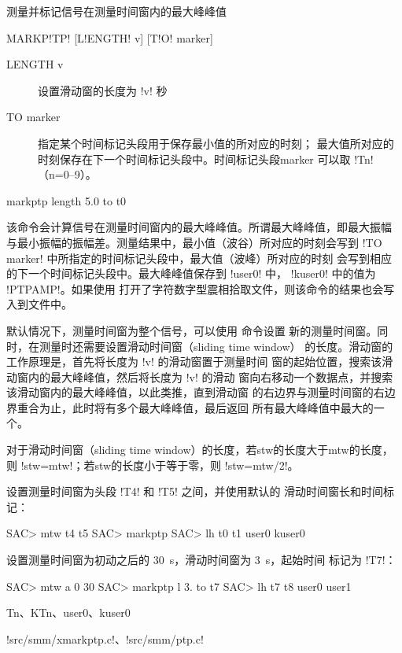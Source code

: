 \label{cmd:markptp}

测量并标记信号在测量时间窗内的最大峰峰值

\begin{SACSTX}
MARKP!TP! [L!ENGTH! v] [T!O! marker]
\end{SACSTX}

\begin{description}
\item [LENGTH v] 设置滑动窗的长度为 !v! 秒
\item [TO marker] 指定某个时间标记头段用于保存最小值的所对应的时刻；
    最大值所对应的时刻保存在下一个时间标记头段中。时间标记头段marker
    可以取 !Tn!（n=0--9）。
\end{description}

\begin{SACDFT}
markptp length 5.0 to t0
\end{SACDFT}

该命令会计算信号在测量时间窗内的最大峰峰值。所谓最大峰峰值，即最大振幅
与最小振幅的振幅差。测量结果中，最小值（波谷）所对应的时刻会写到
!TO marker! 中所指定的时间标记头段中，最大值（波峰）所对应的时刻
会写到相应的下一个时间标记头段中。最大峰峰值保存到 !user0! 中，
!kuser0! 中的值为 !PTPAMP!。如果使用 
打开了字符数字型震相拾取文件，则该命令的结果也会写入到文件中。

默认情况下，测量时间窗为整个信号，可以使用  命令设置
新的测量时间窗。同时，在测量时还需要设置滑动时间窗（sliding time window）
的长度。滑动窗的工作原理是，首先将长度为 !v! 的滑动窗置于测量时间
窗的起始位置，搜索该滑动窗内的最大峰峰值，然后将长度为 !v! 的滑动
窗向右移动一个数据点，并搜索该滑动窗内的最大峰峰值，以此类推，直到滑动窗
的右边界与测量时间窗的右边界重合为止，此时将有多个最大峰峰值，最后返回
所有最大峰峰值中最大的一个。

对于滑动时间窗（sliding time window）的长度，若stw的长度大于mtw的长度，
则 !stw=mtw!；若stw的长度小于等于零，则 !stw=mtw/2!。

设置测量时间窗为头段 !T4! 和 !T5! 之间，并使用默认的
滑动时间窗长和时间标记：
\begin{SACCode}
SAC> mtw t4 t5
SAC> markptp
SAC> lh t0 t1 user0 kuser0
\end{SACCode}

设置测量时间窗为初动之后的 \SI{30}{s}，滑动时间窗为 \SI{3}{s}，起始时间
标记为 !T7!：
\begin{SACCode}
SAC> mtw a 0 30
SAC> markptp l 3. to t7
SAC> lh t7 t8 user0 user1
\end{SACCode}

Tn、KTn、user0、kuser0

!src/smm/xmarkptp.c!、!src/smm/ptp.c!
